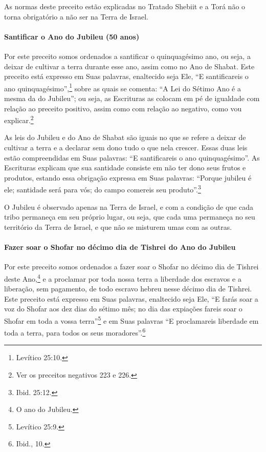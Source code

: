 As normas deste preceito estão explicadas no Tratado Shebiit e a Torá
não o torna obrigatório a não ser na Terra de Israel.

\paragraph{Santificar o Ano do Jubileu (50 anos)}

Por este preceito somos ordenados a santificar o quinquagésimo ano, ou
seja, a deixar de cultivar a terra durante esse ano, assim como no Ano
de Shabat. Este preceito está expresso em Suas palavras, enaltecido seja
Ele, ``E santificareis o ano quinquagésimo'',\footnote{Levítico 25:10.} sobre as
quais se comenta: ``A Lei do Sétimo Ano é a mesma da do Jubileu''; ou
seja, as Escrituras as colocam em pé de igualdade com relação ao preceito positivo, assim como com relação ao negativo, como vou explicar.\footnote{Ver os preceitos negativos 223 e 226.}

As leis do Jubileu e do Ano de Shabat são iguais no que se refere a
deixar de cultivar a terra e a declarar sem dono tudo o que nela crescer. Essas
duas leis estão compreendidas em Suas palavras: ``E santificareis o ano
quinquagésimo''. As Escrituras explicam que sua santidade consiste em
não ter dono seus frutos e produtos, estando essa obrigação expressa em
Suas palavras: ``Porque jubileu é ele; santidade será para vós; do
campo comereis seu produto''.\footnote{Ibid. 25:12.}

O Jubileu é observado apenas na Terra de Israel, e com a condição de que
cada tribo permaneça em seu próprio lugar, ou seja, que cada uma
permaneça no seu território da Terra de Israel, e que não se misturem
umas com as outras.

\paragraph{Fazer soar o Shofar no décimo dia de Tishrei do Ano do Jubileu}

Por este preceito somos ordenados a fazer soar o Shofar no décimo
dia de Tishrei deste Ano,\footnote{O ano do Jubileu.} e a proclamar por
toda nossa terra a liberdade dos escravos e a liberação, sem pagamento,
de todo escravo hebreu nesse décimo dia de Tishrei. Este preceito
está expresso em Suas palavras, enaltecido seja Ele, ``E farás soar a
voz do Shofar aos dez dias do sétimo mês; no dia das expiações fareis
soar o Shofar em toda a vossa terra''\footnote{Levítico 25:9.} e em Suas
palavras ``E proclamareis liberdade em toda a terra, para todos os seus
moradores''.\footnote{Ibid., 10.}

